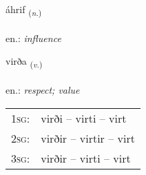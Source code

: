 \documentclass[frontgrid, backgrid]{flacards}\usepackage[]{graphicx}\usepackage[]{xcolor}
\begin{document}
{áhrif \small{\textsubscript{(\textit{n.})}} \\[1ex] %
\textphonetic{[auːr̥ɪv]} \\
en.: \emph{influence} \\  [2ex]
\renewcommand*{\arraystretch}{0.8}
}

\renewcommand{\flhead}{\vskip5pt \fboxsep=0pt {\small\bfseries\footnotesize Sagnorð | Verb}}
\renewcommand{\fcfoot}{\vskip5pt \fboxsep=0pt \hspace{2pt}{\small\bfseries\footnotesize 1K}}

\renewcommand{\blhead}{\vskip5pt {\small\bfseries\footnotesize Sagnorð | Verb }}
\renewcommand{\bcfoot}{\vskip5pt \hspace{2pt}{\small\bfseries\footnotesize 1K}}


{virða \small{\textsubscript{(\textit{v.})}} \\[1ex] %
\textphonetic{[vɪrða]} \\
en.: \emph{respect; value} \\  [2ex]
\renewcommand*{\arraystretch}{0.8}
\begin{tabular}{p{1cm}l}
\textsc{1sg}: & virði -- virti -- virt \\ 
\textsc{2sg}: & virðir -- virtir -- virt \\ 
\textsc{3sg}: & virðir -- virti -- virt \\ 
\end{tabular}
}

\renewcommand{\flhead}{\vskip5pt \fboxsep=0pt {\small\bfseries\footnotesize Sagnorð | Verb}}
\renewcommand{\fcfoot}{\vskip5pt \fboxsep=0pt \hspace{2pt}{\small\bfseries\footnotesize 1K}}

\renewcommand{\blhead}{\vskip5pt {\small\bfseries\footnotesize Sagnorð | Verb }}
\renewcommand{\bcfoot}{\vskip5pt \hspace{2pt}{\small\bfseries\footnotesize 1K}}
\end{document}
